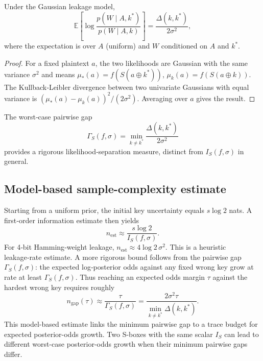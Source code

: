 \begin{proposition}\label{prop:pairwise-gain}
  Under the Gaussian leakage model,
  \begin{equation}\label{eq:llr-gain}
    \mathbb E\left[\log\frac{p(W\mid A,k^*)}{p(W\mid A,k)}\right]
    = \frac{\Delta(k,k^*)}{2\sigma^2},
  \end{equation}
  where the expectation is over $A$ (uniform) and $W$ conditioned on $A$ and $k^*$.
\end{proposition}

\begin{proof}
  For a fixed plaintext $a$, the two likelihoods are Gaussian with the same
  variance $\sigma^2$ and means $\mu_*(a)=f(S(a\oplus k^*))$,
  $\mu_k(a)=f(S(a\oplus k))$.  The Kullback‑Leibler divergence between two
  univariate Gaussians with equal variance is $(\mu_*(a)-\mu_k(a))^2/(2\sigma^2)$.
  Averaging over $a$ gives the result.
\end{proof}

The worst‑case pairwise gap
\begin{equation}\label{eq:gamma-gap}
  \Gamma_S(f,\sigma) = \min_{k\neq k^*} \frac{\Delta(k,k^*)}{2\sigma^2}
\end{equation}
provides a rigorous likelihood‑separation measure, distinct from $I_S(f,\sigma)$
in general.

\subsection{Model-based sample-complexity estimate}\label{subsec:convergence}

Starting from a uniform prior, the initial key uncertainty equals $s\log2$ nats.
A first‑order information estimate then yields
\begin{equation}\label{eq:sample-estimate}
  n_{\mathrm{est}} \approx \frac{s\log2}{I_S(f,\sigma)}.
\end{equation}
For 4‑bit Hamming‑weight leakage, $n_{\mathrm{est}}\approx 4\log2\,\sigma^2$.
This is a heuristic leakage‑rate estimate.  A more rigorous bound follows from
the pairwise gap $\Gamma_S(f,\sigma)$: the expected log‑posterior odds against
any fixed wrong key grow at rate at least $\Gamma_S(f,\sigma)$.  Thus reaching
an expected odds margin $\tau$ against the hardest wrong key requires roughly
\begin{equation}\label{eq:gap-sample-estimate}
  n_{\mathrm{gap}}(\tau)
  \approx \frac{\tau}{\Gamma_S(f,\sigma)}
  = \frac{2\sigma^2\tau}{\min_{k\neq k^*}\Delta(k,k^*)}.
\end{equation}
This model-based estimate links the minimum pairwise gap to a trace budget for
expected posterior-odds growth. Two S-boxes with the same scalar $I_S$ can lead
to different worst-case posterior-odds growth when their minimum pairwise gaps
differ.
